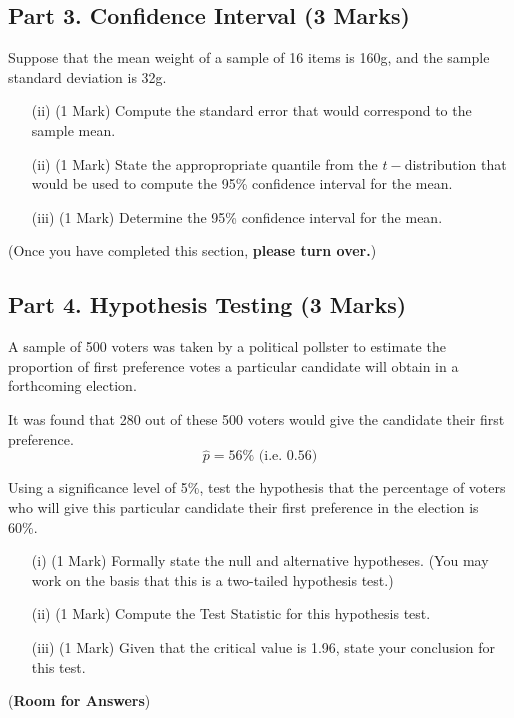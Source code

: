 \documentclass[a4paper,12pt]{article}
\begin{document}
\subsection*{Part 3. Confidence Interval (3 Marks)}

Suppose that the mean weight of a sample of 16 items is 160g, and the sample standard deviation is 32g.



\begin{itemize}
\item[(ii)] (1 Mark) Compute the standard error that would correspond to the sample mean.
\item[(ii)] (1 Mark) State the appropropriate quantile from the $t-$distribution that would be used to compute the 95\% confidence interval for the mean.
\item[(iii)] (1 Mark) Determine the 95\% confidence interval for the mean.
\end{itemize}
(Once you have completed this section, \textbf{please turn over.})
\newpage
\subsection*{Part 4. Hypothesis Testing (3 Marks)}

\noindent A sample of 500 voters was taken by a political pollster to estimate the proportion of first preference votes a particular candidate will obtain in a forthcoming election. \\
\bigskip

\noindent It was found that 280 out of these 500 voters would give the candidate their first preference.
\[\hat{p} = 56\%  \mbox{    (i.e.  } 0.56)\]

\vspace{0.4cm}
\noindent
Using a significance level of 5\%, test the hypothesis that the percentage of voters who will give this particular candidate their first preference in the election is 60\%.\\


\begin{itemize}
\item[(i)] (1 Mark) Formally state the null and alternative hypotheses. (You may work on the basis that this is a two-tailed hypothesis test.)

\item[(ii)] (1 Mark) Compute the Test Statistic for this hypothesis test.
\item[(iii)] (1 Mark) Given that the critical value is 1.96, state your conclusion for this test.
\end{itemize}
\newpage
(\textbf{Room for Answers})
\newpage
\end{document}
